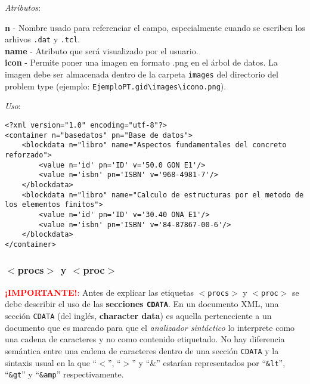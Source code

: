 \documentclass[10pt, a4paper, twocolumn]{article}
\begin{document}
\vspace{0.15cm}
\textit{Atributos}:

\vspace{0.15cm}
	\textbf{n} - Nombre usado para referenciar el campo, especialmente cuando se escriben los arhivos \texttt{.dat} y \texttt{.tcl}.\\
	\textbf{name} - Atributo que será visualizado por el usuario.\\
	\textbf{icon} - Permite poner una imagen en formato .png en el árbol de datos. La imagen debe ser almacenada dentro de la carpeta \texttt{images} del directorio del problem type (ejemplo: \texttt{EjemploPT.gid\textbackslash images\textbackslash icono.png}).\\
\vspace{0.15cm}

\textit{Uso}:
\vspace{0.15cm}

\lstset{language=XML} 
\begin{lstlisting}[caption={Uso de <blockdata> para agrupar otros elementos.}]
<?xml version="1.0" encoding="utf-8"?>
<container n="basedatos" pn="Base de datos">
	<blockdata n="libro" name="Aspectos fundamentales del concreto reforzado">
		<value n='id' pn='ID' v='50.0 GON E1'/>
		<value n='isbn' pn='ISBN' v='968-4981-7'/>
	</blockdata>
	<blockdata n="libro" name="Calculo de estructuras por el metodo de los elementos finitos">
		<value n='id' pn='ID' v='30.40 ONA E1'/>
		<value n='isbn' pn='ISBN' v='84-87867-00-6'/>
	</blockdata>
</container>
\end{lstlisting}


\subsubsection{$<$procs$>$ y $<$proc$>$} \label{sec:calculararea}

\textcolor{red}{\textbf{¡IMPORTANTE!}:} Antes de explicar las etiquetas \texttt{$<$procs$>$} y \texttt{$<$proc$>$} se debe describir el uso de las \textbf{secciones \texttt{CDATA}}. En un documento XML, una sección \texttt{CDATA} (del inglés, \textbf{character data}) es aquella perteneciente a un documento que es marcado para que el \textit{analizador sintáctico} lo interprete como una cadena de caracteres y no como contenido etiquetado. No hay diferencia semántica entre una cadena de caracteres dentro de una sección \texttt{CDATA} y la sintaxis usual en la que ``$<$'', ``$>$'' y ``$\&$'' estarían representados por ``\texttt{\&lt}'', ``\texttt{\&gt}'' y ``\texttt{\&amp}'' respectivamente.
\end{document}

